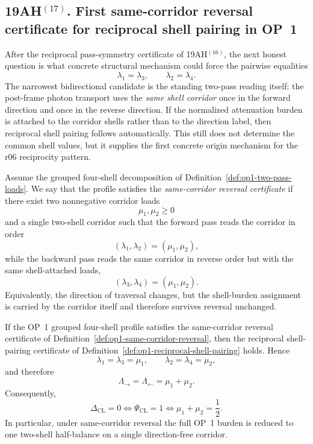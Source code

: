 \subsection*{19AH$^{(17)}$. First same-corridor reversal certificate for reciprocal shell pairing in OP~1}
After the reciprocal pass-symmetry certificate of 19AH$^{(16)}$, the next honest question is what concrete structural mechanism could force the pairwise equalities
\[
  \lambda_1=\lambda_3,
  \qquad
  \lambda_2=\lambda_4.
\]
The narrowest bidirectional candidate is the standing two-pass reading itself: the post-frame photon transport uses the \emph{same shell corridor} once in the forward direction and once in the reverse direction. If the normalized attenuation burden is attached to the corridor shells rather than to the direction label, then reciprocal shell pairing follows automatically. This still does not determine the common shell values, but it supplies the first concrete origin mechanism for the r06 reciprocity pattern.

\begin{definition}
\label{def:op1-same-corridor-reversal}
Assume the grouped four-shell decomposition of Definition~\ref{def:op1-two-pass-loads}. We say that the profile satisfies the \emph{same-corridor reversal certificate} if there exist two nonnegative corridor loads
\[
  \mu_1,\mu_2\ge 0
\]
and a single two-shell corridor such that the forward pass reads the corridor in order
\[
  (\lambda_1,\lambda_2)=(\mu_1,\mu_2),
\]
while the backward pass reads the same corridor in reverse order but with the same shell-attached loads,
\[
  (\lambda_3,\lambda_4)=(\mu_1,\mu_2).
\]
Equivalently, the direction of traversal changes, but the shell-burden assignment is carried by the corridor itself and therefore survives reversal unchanged.
\end{definition}

\begin{proposition}
\label{prop:op1-same-corridor-implies-reciprocity}
If the OP~1 grouped four-shell profile satisfies the same-corridor reversal certificate of Definition~\ref{def:op1-same-corridor-reversal}, then the reciprocal shell-pairing certificate of Definition~\ref{def:op1-reciprocal-shell-pairing} holds. Hence
\[
  \lambda_1=\lambda_3=\mu_1,
  \qquad
  \lambda_2=\lambda_4=\mu_2,
\]
and therefore
\[
  \Lambda_{\rightarrow}=\Lambda_{\leftarrow}=\mu_1+\mu_2.
\]
Consequently,
\[
  \Delta_{\mathrm{CL}}=0
  \iff
  \Psi_{\mathrm{CL}}=1
  \iff
  \mu_1+\mu_2=\frac12.
\]
In particular, under same-corridor reversal the full OP~1 burden is reduced to one two-shell half-balance on a single direction-free corridor.
\end{proposition}


